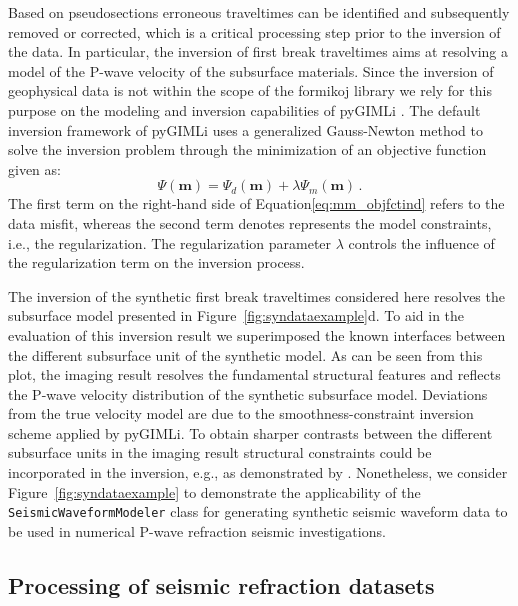 \documentclass[a4paper,fleqn]{cas-sc}
\newcommand{\vecmat}[1]{\bm #1}
\begin{document}
Based on pseudosections erroneous traveltimes can be identified and subsequently removed or corrected, which is a critical processing step prior to the inversion of the data. In particular, the inversion of first break traveltimes aims at resolving a model of the P-wave velocity of the subsurface materials. Since the inversion of geophysical data is not within the scope of the formikoj library we rely for this purpose on the modeling and inversion capabilities of pyGIMLi \citep{ruecker2017}. The default inversion framework of pyGIMLi uses a generalized Gauss-Newton method to solve the inversion problem through the minimization of an objective function given as:
\begin{equation}
	\Psi\left(\vecmat{m}\right)=\Psi_d\left(\vecmat{m}\right)+\lambda\Psi_m\left(\vecmat{m}\right)\,.
	\label{eq:mm_objfctind}
\end{equation}
The first term on the right-hand side of Equation\ref{eq:mm_objfctind} refers to the data misfit, whereas the second term denotes represents the model constraints, i.e., the regularization. The regularization parameter $\lambda$ controls the influence of the regularization term on the inversion process.

The inversion of the synthetic first break traveltimes considered here resolves the subsurface model presented in Figure~\ref{fig:syndataexample}d. To aid in the evaluation of this inversion result we superimposed the known interfaces between the different subsurface unit of the synthetic model. As can be seen from this plot, the imaging result resolves the fundamental structural features  and reflects the P-wave velocity distribution of the synthetic subsurface model. Deviations from the true velocity model are due to the smoothness-constraint inversion scheme applied by pyGIMLi. To obtain sharper contrasts between the different subsurface units in the imaging result structural constraints could be incorporated in the inversion, e.g., as demonstrated by \citep{steiner2021}. Nonetheless, we consider Figure~\ref{fig:syndataexample} to demonstrate the applicability of the \texttt{SeismicWaveformModeler} class for generating synthetic seismic waveform data to be used in numerical P-wave refraction seismic investigations.

\subsection{Processing of seismic refraction datasets}
\end{document}
